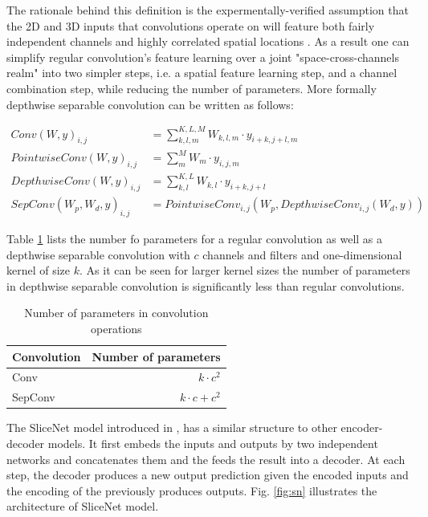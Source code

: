 \documentclass[a4paper]{article}
\begin{document}
The rationale behind this definition  is  the  expermentally-verified assumption
that the  2D and 3D inputs that convolutions operate on will feature both fairly
independent    channels    and    highly    correlated     spatial     locations
\cite{DBLP:journals/corr/KaiserGC17}.  As  a  result one  can  simplify  regular
convolution's  feature  learning over  a joint "space-cross-channels realm" into
two  simpler  steps,  i.e.  a  spatial  feature  learning  step,  and a  channel
combination  step, while  reducing  the  number  of  parameters.  More  formally
depthwise separable convolution can be written as follows:


\begin{align*}
  Conv (W, y)_{i,j} &= \sum_{k,l,m}^{K,L,M}{W_{k,l,m} \cdot y_{i+k,j+l,m}} \\
  PointwiseConv (W, y)_{i,j} &= \sum_{m}^{M}{W_m \cdot y_{i,j,m}} \\
  DepthwiseConv (W, y)_{i,j} &= \sum_{k,l}^{K,L}{W_{k,l} \cdot y_{i+k,j+l}} \\
  SepConv (W_p, W_d, y)_{i,j} &=
    PointwiseConv_{i,j}(W_p, DepthwiseConv_{i,j}(W_d, y))
\end{align*}


Table \ref{tab:convpar} lists the number fo parameters for a regular convolution
as well as a depthwise separable  convolution with  $c$ channels and filters and
one-dimensional kernel  of  size $k$. As it can be seen  for larger kernel sizes
the number  of  parameters in  depthwise separable convolution  is significantly
less than regular convolutions.


\begin{table}
  \center
  \begin{tabular}{lr}
  \hline
    Convolution & Number of parameters\\
  \hline
    Conv & $k \cdot c^2$ \\
    SepConv & $k \cdot c + c^2$ \\
  \hline
  \end{tabular}
  \caption{Number of parameters in convolution operations}
  \label{tab:convpar}
\end{table}


The SliceNet  model  introduced  in \cite{DBLP:journals/corr/KaiserGC17},  has a
similar structure  to other encoder-decoder models. It  first embeds the  inputs
and outputs by two independent networks  and concatenates them and the feeds the
result  into  a  decoder. At  each  step,  the  decoder produces  a  new  output
prediction given the  encoded inputs and the encoding of the previously produces
outputs. Fig. \ref{fig:sn} illustrates the architecture of SliceNet model.
\end{document}
